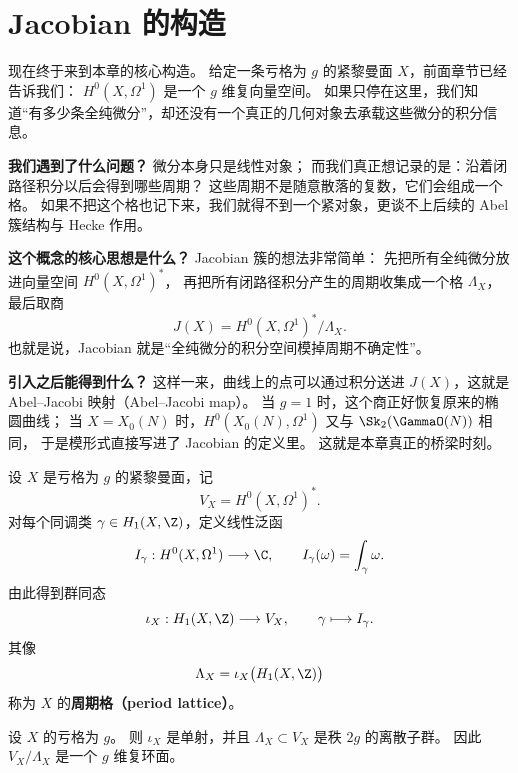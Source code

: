 \section{Jacobian 的构造}
\label{sec:jacobian-construction}

现在终于来到本章的核心构造。
给定一条亏格为 $g$ 的紧黎曼面 $X$，前面章节已经告诉我们：
$H^0(X,\Omega^1)$ 是一个 $g$ 维复向量空间。
如果只停在这里，我们知道“有多少条全纯微分”，却还没有一个真正的几何对象去承载这些微分的积分信息。

\textbf{我们遇到了什么问题？}
微分本身只是线性对象；
而我们真正想记录的是：沿着闭路径积分以后会得到哪些周期？
这些周期不是随意散落的复数，它们会组成一个格。
如果不把这个格也记下来，我们就得不到一个紧对象，更谈不上后续的 Abel 簇结构与 Hecke 作用。

\textbf{这个概念的核心思想是什么？}
Jacobian 簇的想法非常简单：
先把所有全纯微分放进向量空间 $H^0(X,\Omega^1)^*$，
再把所有闭路径积分产生的周期收集成一个格 $\Lambda_X$，最后取商
\[
  J(X)=H^0(X,\Omega^1)^*/\Lambda_X.
\]
也就是说，Jacobian 就是“全纯微分的积分空间模掉周期不确定性”。

\textbf{引入之后能得到什么？}
这样一来，曲线上的点可以通过积分送进 $J(X)$，这就是 Abel--Jacobi 映射（Abel--Jacobi map）。
当 $g=1$ 时，这个商正好恢复原来的椭圆曲线；
当 $X=X_0(N)$ 时，$H^0(X_0(N),\Omega^1)$ 又与 $\Sk_2(\GammaO(N))$ 相同，
于是模形式直接写进了 Jacobian 的定义里。
这就是本章真正的桥梁时刻。



\begin{definition}[周期格]
\label{def:period-lattice}
设 $X$ 是亏格为 $g$ 的紧黎曼面，记
\[
  V_X=H^0(X,\Omega^1)^*.
\]
对每个同调类 $\gamma\in H_1(X,\Z)$，定义线性泛函
\[
  I_\gamma: H^0(X,\Omega^1)\longrightarrow \C,
  \qquad
  I_\gamma(\omega)=\int_\gamma \omega.
\]
由此得到群同态
\[
  \iota_X:H_1(X,\Z)\longrightarrow V_X,
  \qquad
  \gamma\longmapsto I_\gamma.
\]
其像
\[
  \Lambda_X=\iota_X\bigl(H_1(X,\Z)\bigr)
\]
称为 $X$ 的\textbf{周期格（period lattice）}。
\end{definition}

\begin{proposition}[周期格确实是一个格]
\label{prop:period-lattice-is-lattice}
设 $X$ 的亏格为 $g$。
则 $\iota_X$ 是单射，并且 $\Lambda_X\subset V_X$ 是秩 $2g$ 的离散子群。
因此 $V_X/\Lambda_X$ 是一个 $g$ 维复环面。
\end{proposition}

